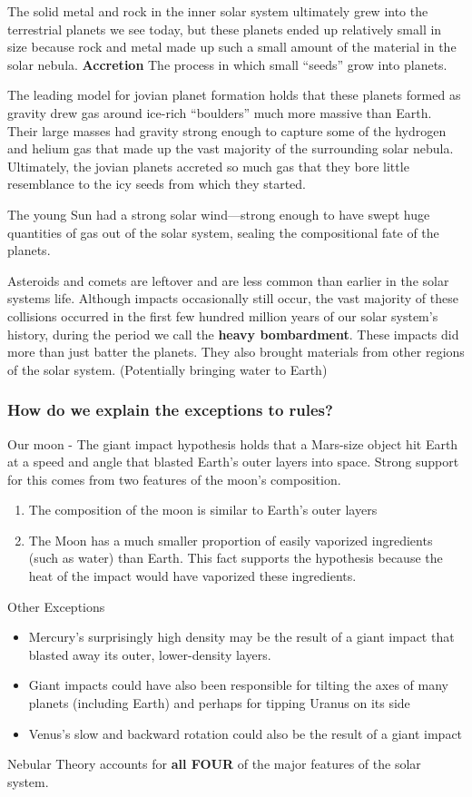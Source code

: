 The solid metal and rock in the inner solar system ultimately grew into the terrestrial planets we see today, but these planets ended up relatively small in size because rock and metal made up such a small amount of the material in the solar nebula. {\bf Accretion} The process in which small ``seeds'' grow into planets.

The leading model for jovian planet formation holds that these planets formed as gravity drew gas around ice-rich ``boulders'' much more massive than Earth. Their large masses had gravity strong enough to capture some of the hydrogen and
helium gas that made up the vast majority of the surrounding solar nebula. Ultimately, the jovian planets accreted so
much gas that they bore little resemblance to the icy seeds from which
they started.

The young Sun had a strong solar wind—strong enough to have swept huge quantities of gas out of the solar system, sealing the compositional fate of the planets.

Asteroids and comets are leftover and are less common than earlier in the solar systems life. Although impacts occasionally still occur, the vast majority of these collisions occurred in the first few hundred million years of our solar system’s history, during the period we call the {\bf heavy bombardment}. These impacts did more than just batter the planets. They also brought materials from other regions of the solar system. (Potentially bringing water to Earth)

\subsubsection{How do we explain the exceptions to rules?}
Our moon - The giant impact hypothesis holds that a Mars-size object hit Earth at a speed and angle that blasted Earth’s outer layers into space. Strong support for this comes from two features of the moon's composition.
\begin{enumerate}
\item The composition of the moon is similar to Earth's outer layers
\item The Moon has a much smaller proportion of easily vaporized ingredients (such as water) than Earth. This fact supports the hypothesis because the heat of the impact would have vaporized these ingredients.
\end{enumerate}

Other Exceptions
\begin{itemize}
\item Mercury’s surprisingly high density may be the result of a giant impact that blasted away its outer, lower-density layers.
\item Giant impacts could have also been responsible for tilting the axes of many planets (including Earth) and perhaps for tipping Uranus on its side
\item Venus’s slow and backward rotation could also be the result of a giant impact
\end{itemize}
Nebular Theory accounts for {\bf all FOUR} of the major features of the solar system.

